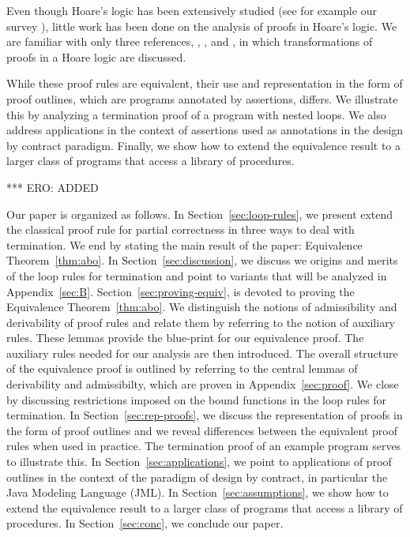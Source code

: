 \documentclass[manuscript, screen, review]{acmart}
\begin{document}
Even though Hoare's logic has been extensively studied (see for
example our survey \cite{AO19}), little work has been done on the
analysis of proofs in Hoare's logic. We are familiar with only three
references, \cite{Apt81a}, \cite{GR16}, and \cite{Tiu02}, in which
transformations of proofs in a Hoare logic are discussed.

While these proof rules are equivalent, their use and representation
in the form of proof outlines, which are programs annotated by
assertions, differs. We illustrate this by analyzing a termination
proof of a program with nested loops. We also address applications in
the context of assertions used as annotations in the design by
contract paradigm.
Finally, we show how to extend the equivalence result to a larger class of programs
that access a library of procedures.

\III
\NI
*** ERO: ADDED

Our paper is organized as follows.
In Section~\ref{sec:loop-rules}, we present extend the classical proof rule
for partial correctness in three ways to deal with termination.
We end by stating the main result of the paper: Equivalence Theorem~\ref{thm:abo}.
In Section~\ref{sec:discussion}, we discuss we origins and merits 
of the loop rules for termination and point to variants that will be analyzed in Appendix~\ref{sec:B}.
Section~\ref{sec:proving-equiv}, is devoted to proving the Equivalence Theorem~\ref{thm:abo}. 
We distinguish the notions
of admissibility and derivability of proof rules and relate them
by referring to the notion of auxiliary rules. 
These lemmas provide the blue-print for our equivalence proof.
The auxiliary rules needed for our analysis are then introduced. 
The overall structure of the equivalence
proof is outlined by referring to the central lemmas of 
derivability and admissibilty, which are proven in Appendix~\ref{sec:proof}.
We close by discussing restrictions imposed on the bound functions
in the loop rules for termination.
In Section~\ref{sec:rep-proofs}, we discuss the representation of proofs
in the form of proof outlines and we reveal differences between the
equivalent proof rules when used in practice.
The termination proof of an example program serves to illustrate this.
In Section~\ref{sec:applications}, we point to applications of proof outlines
in the context of the paradigm of design by contract,
in particular the Java Modeling Language (JML).
In Section~\ref{sec:assumptions}, we show how to extend the equivalence result 
to a larger class of programs that access a library of procedures.
In Section~\ref{sec:conc}, we conclude our paper.
\end{document}
